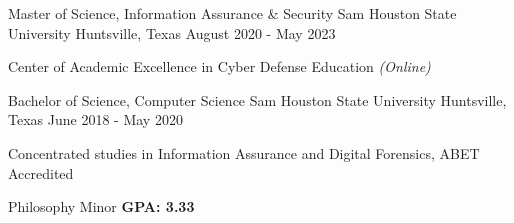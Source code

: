 \begin{cventries}

  \cventry
	{Master of Science, Information Assurance \& Security} %
	{Sam Houston State University} %
	{Huntsville, Texas} %
	{August 2020 - May 2023} %
	{
    \begin{cvitems}
      \item {Center of Academic Excellence in Cyber Defense Education \hfill \textit{(Online)}}
    \end{cvitems}
    }
  \cventry
    {Bachelor of Science, Computer Science} %
    {Sam Houston State University} %
    {Huntsville, Texas} %
    {June 2018 - May 2020} %
    {
      \begin{cvitems} %
        \item{Concentrated studies in Information Assurance and Digital Forensics, ABET Accredited}
        \item{Philosophy Minor \hfill \textbf{GPA: 3.33}}        
      \end{cvitems}
    }
\end{cventries}
